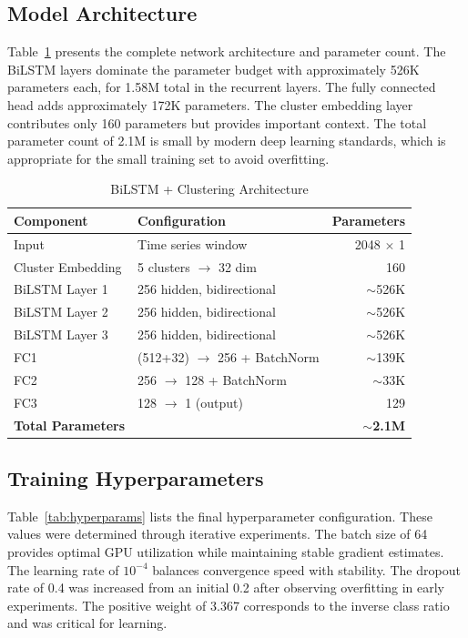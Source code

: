 \documentclass[letterpaper]{article}
\begin{document}
\subsection{Model Architecture}

Table~\ref{tab:architecture} presents the complete network architecture and parameter count. The BiLSTM layers dominate the parameter budget with approximately 526K parameters each, for 1.58M total in the recurrent layers. The fully connected head adds approximately 172K parameters. The cluster embedding layer contributes only 160 parameters but provides important context. The total parameter count of 2.1M is small by modern deep learning standards, which is appropriate for the small training set to avoid overfitting.

\begin{table}[h]
\centering
\caption{BiLSTM + Clustering Architecture}
\label{tab:architecture}
\begin{tabular}{@{}llr@{}}
\toprule
\textbf{Component} & \textbf{Configuration} & \textbf{Parameters} \\
\midrule
Input & Time series window & 2048 $\times$ 1 \\
Cluster Embedding & 5 clusters $\rightarrow$ 32 dim & 160 \\
BiLSTM Layer 1 & 256 hidden, bidirectional & $\sim$526K \\
BiLSTM Layer 2 & 256 hidden, bidirectional & $\sim$526K \\
BiLSTM Layer 3 & 256 hidden, bidirectional & $\sim$526K \\
FC1 & (512+32) $\rightarrow$ 256 + BatchNorm & $\sim$139K \\
FC2 & 256 $\rightarrow$ 128 + BatchNorm & $\sim$33K \\
FC3 & 128 $\rightarrow$ 1 (output) & 129 \\
\midrule
\textbf{Total Parameters} & & \textbf{$\sim$2.1M} \\
\bottomrule
\end{tabular}
\end{table}

\subsection{Training Hyperparameters}

Table~\ref{tab:hyperparams} lists the final hyperparameter configuration. These values were determined through iterative experiments. The batch size of 64 provides optimal GPU utilization while maintaining stable gradient estimates. The learning rate of $10^{-4}$ balances convergence speed with stability. The dropout rate of 0.4 was increased from an initial 0.2 after observing overfitting in early experiments. The positive weight of 3.367 corresponds to the inverse class ratio and was critical for learning.
\end{document}
